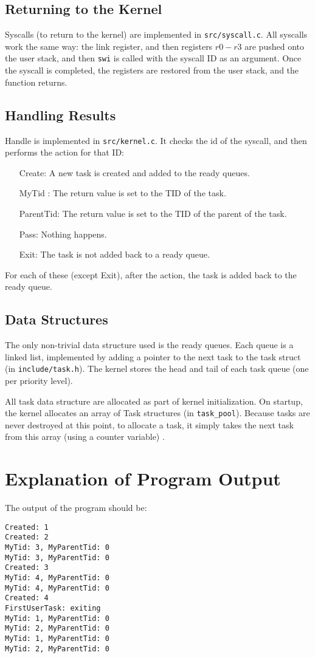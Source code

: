 \documentclass{article}
\begin{document}
\subsection{Returning to the Kernel}
Syscalls (to return to the kernel) are implemented in \verb|src/syscall.c|. All syscalls work the same way: the link register, and then registers $r0-r3$ are pushed onto the user stack, and then \verb|swi| is called with the syscall ID as an argument. Once the syscall is completed, the registers are restored from the user stack, and the function returns.


\subsection{Handling Results}
Handle is implemented in \verb|src/kernel.c|. It checks the id of the syscall, and then performs the action for that ID:
\begin{enumerate}
\item[Create:] A new task is created and added to the ready queues.
\item[MyTid]: The return value is set to the TID of the task.
\item[ParentTid:] The return value is set to the TID of the parent of the task.
\item[Pass:] Nothing happens.
\item[Exit:] The task is not added back to a ready queue.
\end{enumerate}

For each of these (except Exit), after the action, the task is added back to the ready queue.

\subsection{Data Structures}
The only non-trivial data structure used is the ready queues. Each queue is a linked list, implemented by adding a pointer to the next task to the task struct (in \verb|include/task.h|). 
The kernel stores the head and tail of each task queue (one per priority level).

All task data structure are allocated as part of kernel initialization. On startup, the kernel allocates an array of Task structures (in \verb|task_pool|). Because tasks are never destroyed at this point, to allocate a task, it simply takes the next task from this array (using a counter variable) . 

\section{Explanation of Program Output}
The output of the program should be:
\begin{verbatim}
Created: 1
Created: 2
MyTid: 3, MyParentTid: 0
MyTid: 3, MyParentTid: 0
Created: 3
MyTid: 4, MyParentTid: 0
MyTid: 4, MyParentTid: 0
Created: 4
FirstUserTask: exiting
MyTid: 1, MyParentTid: 0
MyTid: 2, MyParentTid: 0
MyTid: 1, MyParentTid: 0
MyTid: 2, MyParentTid: 0
\end{verbatim}
\end{document}

